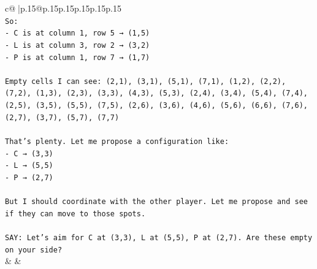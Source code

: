 \documentclass{article}
\begin{document}
{\begin{supertabular}{c@{$\;$}|p{.15\linewidth}@{}p{.15\linewidth}p{.15\linewidth}p{.15\linewidth}p{.15\linewidth}p{.15\linewidth}}
{{{\\ 
\texttt{So:} \\
\texttt{{-} C is at column 1, row 5 → (1,5)} \\
\texttt{{-} L is at column 3, row 2 → (3,2)} \\
\texttt{{-} P is at column 1, row 7 → (1,7)} \\
\\ 
\texttt{Empty cells I can see: (2,1), (3,1), (5,1), (7,1), (1,2), (2,2), (7,2), (1,3), (2,3), (3,3), (4,3), (5,3), (2,4), (3,4), (5,4), (7,4), (2,5), (3,5), (5,5), (7,5), (2,6), (3,6), (4,6), (5,6), (6,6), (7,6), (2,7), (3,7), (5,7), (7,7)} \\
\\ 
\texttt{That's plenty. Let me propose a configuration like:} \\
\texttt{{-} C → (3,3)} \\
\texttt{{-} L → (5,5)} \\
\texttt{{-} P → (2,7)} \\
\\ 
\texttt{But I should coordinate with the other player. Let me propose and see if they can move to those spots.} \\
\\ 
\texttt{SAY: Let's aim for C at (3,3), L at (5,5), P at (2,7). Are these empty on your side?} \\
            }
        }
    }
    & & \\ \\


\end{supertabular}}
\end{document}
